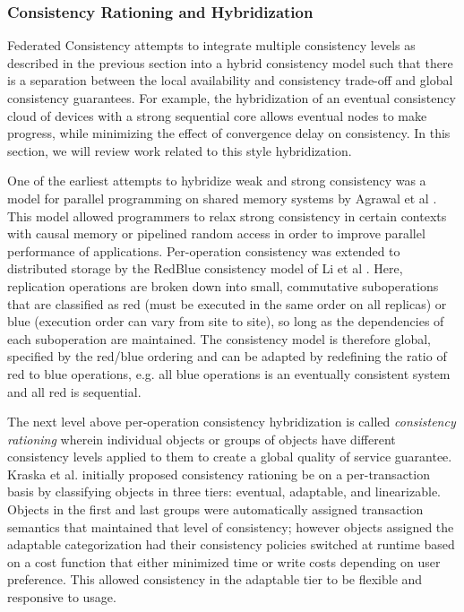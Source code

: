 \documentclass{article}
\begin{document}
\subsubsection{Consistency Rationing and Hybridization}

Federated Consistency attempts to integrate multiple consistency levels as described in the previous section into a hybrid consistency model such that there is a separation between the local availability and consistency trade-off and global consistency guarantees. For example, the hybridization of an eventual consistency cloud of devices with a strong sequential core allows eventual nodes to make progress, while minimizing the effect of convergence delay on consistency. In this section, we will review work related to this style hybridization.

One of the earliest attempts to hybridize weak and strong consistency was a model for parallel programming on shared memory systems by Agrawal et al \cite{agrawal_mixed_1994}. This model allowed programmers to relax strong consistency in certain contexts with causal memory or pipelined random access in order to improve parallel performance of applications. Per-operation consistency was extended to distributed storage by the RedBlue consistency model of Li et al \cite{li_making_2012}. Here, replication operations are broken down into small, commutative suboperations that are classified as red (must be executed in the same order on all replicas) or blue (execution order can vary from site to site), so long as the dependencies of each suboperation are maintained. The consistency model is therefore global, specified by the red/blue ordering and can be adapted by redefining the ratio of red to blue operations, e.g. all blue operations is an eventually consistent system and all red is sequential.

The next level above per-operation consistency hybridization is called \textit{consistency rationing} wherein individual objects or groups of objects have different consistency levels applied to them to create a global quality of service guarantee. Kraska et al. \cite{kraska_consistency_2009} initially proposed consistency rationing be on a per-transaction basis by classifying objects in three tiers: eventual, adaptable, and linearizable. Objects in the first and last groups were automatically assigned transaction semantics that maintained that level of consistency; however objects assigned the adaptable categorization had their consistency policies switched at runtime based on a cost function that either minimized time or write costs depending on user preference. This allowed consistency in the adaptable tier to be flexible and responsive to usage.
\end{document}
